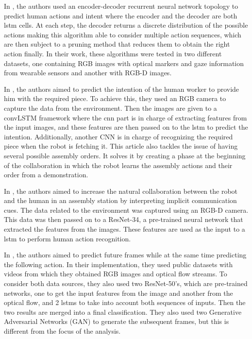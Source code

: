 In \cite{Schydlo2018}, the authors used an encoder-decoder recurrent neural network topology to predict human actions and intent where the encoder and the decoder are both \acs{lstm} cells. At each step, the decoder returns a discrete distribution of the possible actions making this algorithm able to consider multiple action sequences, which are then subject to a pruning method that reduces them to obtain the right action finally. In their work, these algorithms were tested in two different datasets, one containing RGB images with optical markers and gaze information from wearable sensors and another with RGB-D images.

In \cite{Zhang2022}, the authors aimed to predict the intention of the human worker to provide him with the required piece. To achieve this, they used an RGB camera to capture the data from the environment. Then the images are given to a convLSTM framework where the \acs{cnn} part is in charge of extracting features from the input images, and these features are then passed on to the \acs{lstm} to predict the intention. Additionally, another CNN is in charge of recognizing the required piece when the robot is fetching it. This article also tackles the issue of having several possible assembly orders. It solves it by creating a phase at the beginning of the collaboration in which the robot learns the assembly actions and their order from a demonstration.

In \cite{Moutinho2023}, the authors aimed to increase the natural collaboration between the robot and the human in an assembly station by interpreting implicit communication cues. The data related to the environment was captured using an RGB-D camera. This data was then passed on to a ResNet-34, a pre-trained neural network that extracted the features from the images. These features are used as the input to a \acs{lstm} to perform human action recognition.

In \cite{Gammulle2019}, the authors aimed to predict future frames while at the same time predicting the following action. In their implementation, they used public datasets with videos from which they obtained RGB images and optical flow streams. To consider both data sources, they also used two ResNet-50's, which are pre-trained networks, one to get the input features from the image and another from the optical flow, and 2 \acp{lstm} to take into account both sequences of inputs. Then the two results are merged into a final classification. They also used two Generative Adversarial Networks (GAN) to generate the subsequent frames, but this is different from the focus of the analysis.

